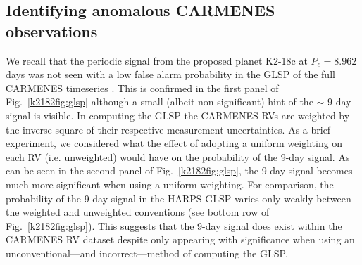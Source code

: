 \subsection{Identifying anomalous CARMENES observations} \label{k2182sect:anomalous}
We recall that the periodic signal from the proposed planet K2-18c at $P_c=8.962$ days was not seen with a low
false alarm probability in the GLSP of the full CARMENES timeseries . This is confirmed in the
first panel of Fig.~\ref{k2182fig:glsp} although a small (albeit non-significant) hint of the $\sim$ 9-day signal is visible.
In computing the GLSP the CARMENES RVs are weighted by the inverse square of their respective measurement
uncertainties. As a brief experiment, we considered what the effect of adopting a uniform weighting on each RV (i.e.
unweighted) would have on the probability of
the 9-day signal. As can be seen in the second panel of Fig.~\ref{k2182fig:glsp}, the 9-day signal becomes much more significant
when using a uniform weighting. For comparison, the probability of the 9-day signal in the HARPS GLSP varies only weakly
between the weighted and unweighted conventions (see bottom row of Fig.~\ref{k2182fig:glsp}).
This suggests that the 9-day signal {does} exist within the CARMENES RV
dataset despite only appearing with significance when using an unconventional---and incorrect---method of computing the
GLSP. \\

